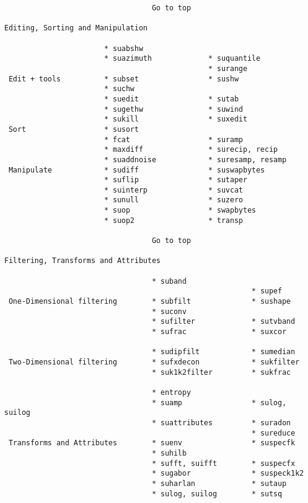 {\begin{verbatim}
                                  Go to top

Editing, Sorting and Manipulation

                       * suabshw
                       * suazimuth             * suquantile
                                               * surange
 Edit + tools          * subset                * sushw
                       * suchw
                       * suedit                * sutab
                       * sugethw               * suwind
                       * sukill                * suxedit
 Sort                  * susort
                       * fcat                  * suramp
                       * maxdiff               * surecip, recip
                       * suaddnoise            * suresamp, resamp
 Manipulate            * sudiff                * suswapbytes
                       * suflip                * sutaper
                       * suinterp              * suvcat
                       * sunull                * suzero
                       * suop                  * swapbytes
                       * suop2                 * transp

                                  Go to top

Filtering, Transforms and Attributes

                                  * suband
                                                         * supef
 One-Dimensional filtering        * subfilt              * sushape
                                  * suconv
                                  * sufilter             * sutvband
                                  * sufrac               * suxcor

                                  * sudipfilt            * sumedian
 Two-Dimensional filtering        * sufxdecon            * sukfilter
                                  * suk1k2filter         * sukfrac

                                  * entropy
                                  * suamp                * sulog, suilog
                                  * suattributes         * suradon
                                                         * sureduce
 Transforms and Attributes        * suenv                * suspecfk
                                  * suhilb
                                  * sufft, suifft        * suspecfx
                                  * sugabor              * suspeck1k2
                                  * suharlan             * sutaup
                                  * sulog, suilog        * sutsq


\end{verbatim}}
